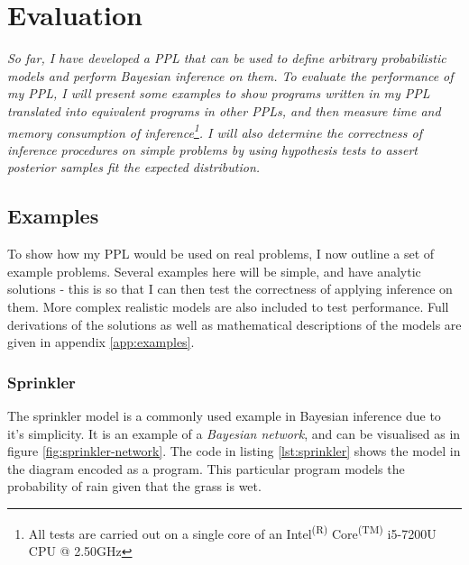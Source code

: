 



\chapter{Evaluation}
\textit{So far, I have developed a PPL that can be used to define arbitrary probabilistic models and perform Bayesian inference on them. To evaluate the performance of my PPL, I will present some examples to show programs written in my PPL translated into equivalent programs in other PPLs, and then measure time and memory consumption of inference\footnote{All tests are carried out on a single core of an Intel\textsuperscript{(R)} Core\textsuperscript{(TM)} i5-7200U CPU @ 2.50GHz}. I will also determine the correctness of inference procedures on simple problems by using hypothesis tests to assert posterior samples fit the expected distribution.}

\section{Examples}
To show how my PPL would be used on real problems, I now outline a set of example problems. Several examples here will be simple, and have analytic solutions - this is so that I can then test the correctness of applying inference on them. More complex realistic models are also included to test performance. Full derivations of the solutions as well as mathematical descriptions of the models are given in appendix \ref{app:examples}.

\subsection{Sprinkler}
The sprinkler model is a commonly used example in Bayesian inference due to it's simplicity. It is an example of a \textit{Bayesian network}, and can be visualised as in figure \ref{fig:sprinkler-network}. The code in listing \ref{lst:sprinkler} shows the model in the diagram encoded as a program. This particular program models the probability of rain given that the grass is wet.

